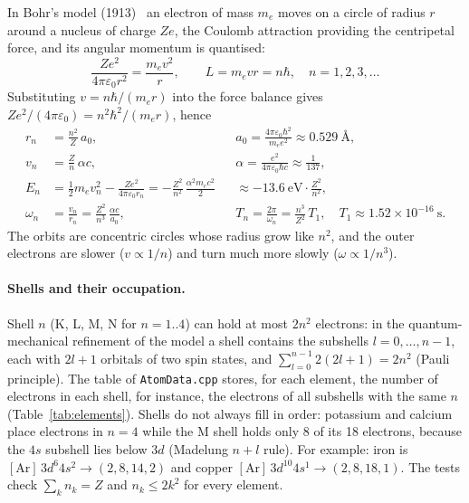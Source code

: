 \documentclass[a4paper, 11pt]{article}
\newcommand{\code}[1]{\texttt{#1}}
\begin{document}
In Bohr's model (1913)~\cite{bohr,bohrwiki} an electron of mass $m_e$ moves on a circle of radius $r$ around a nucleus of charge $Ze$, the Coulomb
attraction providing the centripetal force, and its angular momentum is quantised:
\[
  \frac{Ze^2}{4\pi\varepsilon_0 r^2}=\frac{m_e v^2}{r},\qquad L=m_e v r=n\hbar,\quad n=1,2,3,\dots
\]
Substituting $v=n\hbar/(m_e r)$ into the force balance gives $Ze^2/(4\pi\varepsilon_0)=n^2\hbar^2/(m_e r)$, hence
\begin{align}
  r_n &= \frac{n^2}{Z}\,a_0, && a_0=\frac{4\pi\varepsilon_0\hbar^2}{m_e e^2}\approx0.529\ \text{\AA},\nonumber\\
  v_n &= \frac{Z}{n}\,\alpha c, && \alpha=\frac{e^2}{4\pi\varepsilon_0\hbar c}\approx\frac{1}{137},\nonumber\\
  E_n &= \tfrac12 m_e v_n^2-\frac{Ze^2}{4\pi\varepsilon_0 r_n}=-\frac{Z^2}{n^2}\,\frac{\alpha^2 m_e c^2}{2}
       && \approx-13.6\ \text{eV}\cdot\frac{Z^2}{n^2},\nonumber\\
  \omega_n &= \frac{v_n}{r_n}=\frac{Z^2}{n^3}\,\frac{\alpha c}{a_0}, && T_n=\frac{2\pi}{\omega_n}=\frac{n^3}{Z^2}\,T_1,\quad T_1\approx1.52\times10^{-16}\ \text{s}.
  \label{eq:bohr}
\end{align}
The orbits are concentric circles whose radius grow like $n^2$, and the outer electrons are slower ($v\propto1/n$) and turn much more slowly
($\omega\propto1/n^3$).

\paragraph{Shells and their occupation.} Shell $n$ (K, L, M, N for $n=1..4$) can hold at most $2n^2$ electrons: in the quantum-mechanical
refinement of the model a shell contains the subshells $l=0,\dots,n-1$, each with $2l+1$ orbitals of two spin states, and
$\sum_{l=0}^{n-1}2(2l+1)=2n^2$ (Pauli principle). The table of \code{AtomData.cpp} stores, for each element, the number of electrons in each shell,
for instance, the electrons of all subshells with the same $n$ (Table~\ref{tab:elements}). Shells do not always fill in order: potassium and calcium
place electrons in $n=4$ while the M shell holds only 8 of its 18 electrons, because the $4s$ subshell lies below $3d$ (Madelung $n+l$ rule). For example:
iron is $[\text{Ar}]\,3d^6 4s^2\to(2,8,14,2)$ and copper $[\text{Ar}]\,3d^{10}4s^1\to(2,8,18,1)$. The tests check
$\sum_k n_k=Z$ and $n_k\le2k^2$ for every element.
\end{document}
